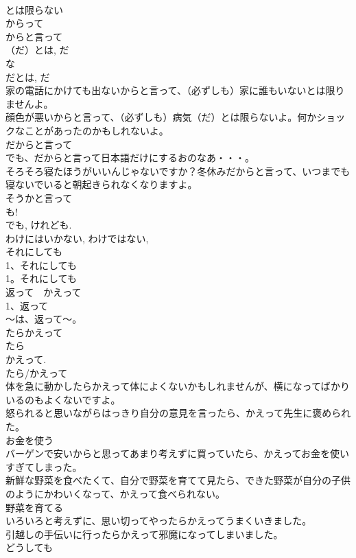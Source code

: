 \documentclass[8pt]{extreport}
\begin{document}
\begin{CJK}{UTF8}{min}
\\	とは限らない 
\\	からって 
\\	からと言って
\\	（だ）とは, だ 
\\	な
\\	だとは, だ 
\\	家の電話にかけても出ないからと言って、（必ずしも）家に誰もいないとは限りませんよ。
\\	顔色が悪いからと言って、（必ずしも）病気（だ）とは限らないよ。何かショックなことがあったのかもしれないよ。
\\	だからと言って
\\	でも、だからと言って日本語だけにするおのなあ・・・。
\\	そろそろ寝たほうがいいんじゃないですか？冬休みだからと言って、いつまでも寝ないでいると朝起きられなくなりますよ。
\\	そうかと言って
\\	も!
\\	でも, けれども. 
\\	わけにはいかない, わけではない, 
\\	それにしても
\\	1、それにしても
\\	1。それにしても
\\	返って　かえって
\\	1、返って
\\	～は、返って～。
\\	たらかえって
\\	たら 
\\	かえって.
\\	たら/かえって 
\\	体を急に動かしたらかえって体によくないかもしれませんが、横になってばかりいるのもよくないですよ。
\\	怒られると思いながらはっきり自分の意見を言ったら、かえって先生に褒められた。
\\	お金を使う　　
\\	バーゲンで安いからと思ってあまり考えずに買っていたら、かえってお金を使いすぎてしまった。
\\	新鮮な野菜を食べたくて、自分で野菜を育てて見たら、できた野菜が自分の子供のようにかわいくなって、かえって食べられない。
\\	野菜を育てる
\\	いろいろと考えずに、思い切ってやったらかえってうまくいきました。
\\	引越しの手伝いに行ったらかえって邪魔になってしまいました。
\\	どうしても

\end{CJK}
\end{document}
